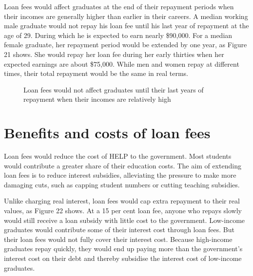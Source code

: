 \documentclass[embargoed]{grattan}
\begin{document}
Loan fees would affect graduates at the end of their repayment periods when their incomes are generally higher than earlier in their careers. A median working male graduate would not repay his loan fee until his last year of repayment at the age of 29. During which he is expected to earn nearly \$90,000. For a median female graduate, her repayment period would be extended by one year, as Figure 21 shows. She would repay her loan fee during her early thirties when her expected earnings are about \$75,000. While men and women repay at different times, their total repayment would be the same in real terms.

\begin{figure}
\caption{Loan fees would not affect graduates until their last years of repayment when their incomes are relatively high}\label{fig:fig21-loan-fees-would-not-affect-grads-until-their-last-years-of-repayment-when-their-incomes-are-relatively-high}



\end{figure}

\section{Benefits and costs of loan fees}\label{sec:benefits-and-costs-of-loan-fees}

Loan fees would reduce the cost of HELP to the government. Most students would contribute a greater share of their education costs. The aim of extending loan fees is to reduce interest subsidies, alleviating the pressure to make more damaging cuts, such as capping student numbers or cutting teaching subsidies.

Unlike charging real interest, loan fees would cap extra repayment to their real values, as Figure 22 shows. At a 15 per cent loan fee, anyone who repays slowly would still receive a loan subsidy with little cost to the government. Low-income graduates would contribute some of their interest cost through loan fees. But their loan fees would not fully cover their interest cost. Because high-income graduates repay quickly, they would end up paying more than the government's interest cost on their debt and thereby subsidise the interest cost of low-income graduates.
\end{document}
